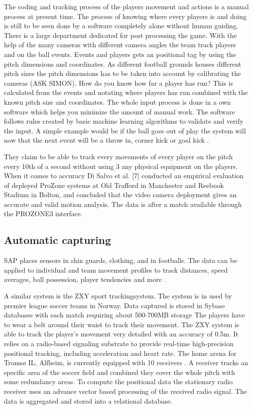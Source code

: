 The coding and tracking process of the players movement and actions is a manual process at present time. The process of knowing where every players is and doing is still to be seen done by a software completely alone without human guiding. There is a large department dedicated for post processing the game. With the help of the many cameras with different camera angles the team track players and on the ball events. Events and players gets an positional tag by using the pitch dimensions and coordinates. As different football grounds houses different pitch sizes the pitch dimensions has to be taken into account by calibrating the cameras (ASK SIMON). How do you know how far a player has run? This is calculated from the events and notating where players has run combined with the known pitch size and coordinates. The whole input process is done in a own software which helps you minimize the amount of manual work. The software follows rules created by basic machine learning algorithms to validate and verify the input. A simple example would be if the ball goes out of play the system will now that the next event will be a throw in, corner kick or goal kick \cite{Prozone:indepth}.

They claim to be able to track every movements of every player on the pitch every 10th of a second without using 3 any physical equipment on the players. When it comes to accuracy Di Salvo et al. [7] conducted an empirical evaluation of deployed ProZone systems at Old Trafford in Manchester and Reebook Stadium in Bolton, and concluded that the video camera deployment gives an accurate and valid motion analysis. The data is after a match available through the PROZONE3 interface. 


\subsection{Automatic capturing}
SAP places sensors in shin guards, clothing, and in footballs. The data can be applied to individual and team movement profiles to track distances, speed averages, ball possession, player tendencies and more . 

A similar system is the ZXY sport trackingsystem. The system is in used by premier league soccer teams in Norway. Data captured is stored in Sybase databases with each match requiring about 500-700MB storage  The players have to wear a belt around their waist to track their movement. The ZXY system is able to track the player’s movement very detailed with an accuracy of 0.5m.  It relies on a radio-based signaling substrate to provide real-time high-precision positional tracking, including acceleration and heart rate. The home arena for Tromsø IL, Alfheim, is currently equipped with 10 receivers . A receiver tracks an specific area of the soccer field and combined they cover the whole pitch with some redundancy areas. To compute the positional data the stationary radio receiver uses an advance vector based processing of the received radio signal. The data is aggregated and stored into a relational database.

